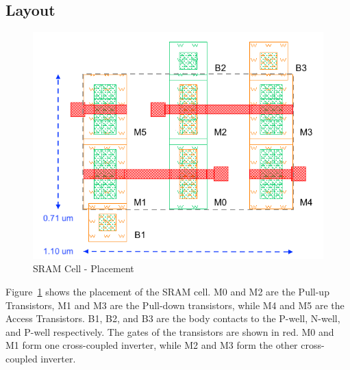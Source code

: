 \documentclass[10pt,letterpaper,onecolumn]{article}
\begin{document}
\subsection{Layout}
\begin{figure}[h!]
    \centering
    \includegraphics[clip,width=0.75\columnwidth]{sram_cell_placement.png}
    \caption{SRAM Cell - Placement}
    \label{fig:sram_cell_placement}
\end{figure}
Figure~\ref{fig:sram_cell_placement} shows the placement of the SRAM cell. M0 and M2 are the Pull-up Transistors, M1 and M3 are the Pull-down transistors, while M4 and M5 are the Access Transistors. B1, B2, and B3 are the body contacts to the P-well, N-well, and P-well respectively. The gates of the transistors are shown in red. M0 and M1 form one cross-coupled inverter, while M2 and M3 form the other cross-coupled inverter.
\end{document}
